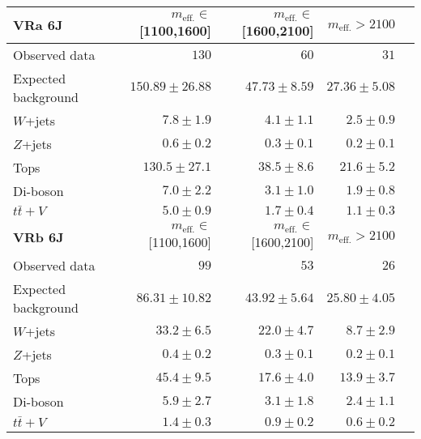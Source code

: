 
\begin{table}
  \begin{center}
    \caption{ \label{tab::BGestimation::VRyields_6J}   }

    \begin{tabular*}{\textwidth}{@{\extracolsep{\fill}}lrrrr}
      \toprule
      \textbf{VRa 6J} & $m_{\mathrm{eff.}}\in$[1100,1600] & $m_{\mathrm{eff.}}\in$[1600,2100] & $m_{\mathrm{eff.}}>2100$ \\
      \midrule
      
Observed data          & $130$              & $60$              & $31$                    \\
\midrule
Expected background         & $150.89 \pm 26.88$          & $47.73 \pm 8.59$          & $27.36 \pm 5.08$              \\
\midrule
        $W$+jets         & $7.8 \pm 1.9$          & $4.1 \pm 1.1$          & $2.5 \pm 0.9$              \\
        $Z$+jets         & $0.6 \pm 0.2$          & $0.3 \pm 0.1$          & $0.2 \pm 0.1$              \\
        Tops         & $130.5 \pm 27.1$          & $38.5 \pm 8.6$          & $21.6 \pm 5.2$              \\
        Di-boson         & $7.0 \pm 2.2$          & $3.1 \pm 1.0$          & $1.9 \pm 0.8$              \\
        $t\bar{t}+V$         & $5.0 \pm 0.9$          & $1.7 \pm 0.4$          & $1.1 \pm 0.3$              \\
\toprule
\textbf{VRb 6J} &  $m_{\mathrm{eff.}}\in$[1100,1600] & $m_{\mathrm{eff.}}\in$[1600,2100] & $m_{\mathrm{eff.}}>2100$ \\
\midrule
Observed data          & $99$              & $53$              & $26$                    \\
\midrule
Expected background         & $86.31 \pm 10.82$          & $43.92 \pm 5.64$          & $25.80 \pm 4.05$              \\
\midrule
        $W$+jets         & $33.2 \pm 6.5$          & $22.0 \pm 4.7$          & $8.7 \pm 2.9$              \\
        $Z$+jets         & $0.4 \pm 0.2$          & $0.3 \pm 0.1$          & $0.2 \pm 0.1$              \\
        Tops         & $45.4 \pm 9.5$          & $17.6 \pm 4.0$          & $13.9 \pm 3.7$              \\
        Di-boson         & $5.9 \pm 2.7$          & $3.1 \pm 1.8$          & $2.4 \pm 1.1$              \\
        $t\bar{t}+V$         & $1.4 \pm 0.3$          & $0.9 \pm 0.2$          & $0.6 \pm 0.2$              \\
        \bottomrule
        \end{tabular*}

  \end{center}
\end{table}



